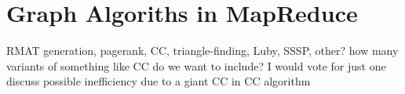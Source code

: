 \section{Graph Algoriths in MapReduce}

  RMAT generation, pagerank, CC, triangle-finding, Luby, SSSP, other?
  how many variants of something like CC do we want to include?
    I would vote for just one
  discuss possible inefficiency due to a giant CC in CC algorithm
